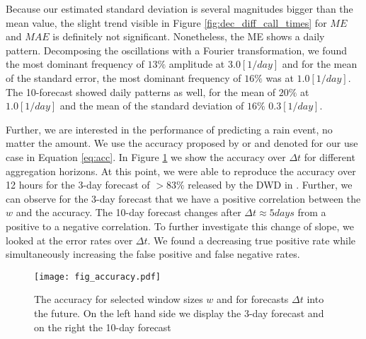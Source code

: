 \documentclass{article}
\theoremstyle{plain}
\theoremstyle{definition}
\theoremstyle{remark}
\begin{document}
Because our estimated standard deviation is several magnitudes bigger than the
mean value, the slight trend visible in Figure \ref{fig:dec_diff_call_times}
for $ME$ and $MAE$ is definitely not significant. Nonetheless, the ME shows a
daily pattern. Decomposing the oscillations with a Fourier transformation, we
found the most dominant frequency of $13\%$ amplitude at $3.0 [1/day]$
and for the mean of the standard error, the most dominant frequency of $16\%$
was at $1.0 [1/day]$. The 10-forecast showed daily patterns as well, for the
mean of $20\%$ at $1.0 [1/day]$ and the mean of the standard deviation of
$16\%$ $0.3 [1/day]$.

Further, we are interested in the performance of predicting a rain event, no
matter the amount. We use the accuracy proposed by \cite{Forecast_quaility_DWD}
or \cite{ECMWF_DL_acc_improvement} and denoted for our use case in Equation
\ref{eq:acc}. In Figure \ref{fig:accuracy} we show the accuracy over $\Delta t$
for different aggregation horizons. At this point, we were able to reproduce
the accuracy over 12 hours for the 3-day forecast of $> 83 \%$ released by the
DWD in \cite{Forecast_quaility_DWD}. Further, we can observe for the 3-day
forecast that we have a positive correlation between the $w$ and the accuracy.
The 10-day forecast changes after $\Delta t\approx 5 days$ from a positive to a
negative correlation. To further investigate this change of slope, we looked at
the error rates over $\Delta t$. We found a decreasing true positive rate while
simultaneously increasing the false positive and false negative rates.

\begin{figure}
    \centering
    \texttt{[image: fig\_accuracy.pdf]}
    \caption{The accuracy for selected window sizes $w$ and for forecasts
        $\Delta t$ into the future. On the left hand side we display the 3-day forecast and on the right the 10-day forecast}
    \label{fig:accuracy}
\end{figure}
\end{document}
